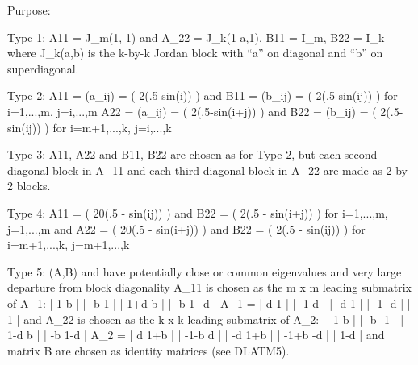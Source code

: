 \begin{DoxyParagraph}{Purpose\+: }
\begin{DoxyVerb}
 Type 1:  A11 = J_m(1,-1) and A_22 = J_k(1-a,1).
          B11 = I_m, B22 = I_k
          where J_k(a,b) is the k-by-k Jordan block with ``a'' on
          diagonal and ``b'' on superdiagonal.

 Type 2:  A11 = (a_ij) = ( 2(.5-sin(i)) ) and
          B11 = (b_ij) = ( 2(.5-sin(ij)) ) for i=1,...,m, j=i,...,m
          A22 = (a_ij) = ( 2(.5-sin(i+j)) ) and
          B22 = (b_ij) = ( 2(.5-sin(ij)) ) for i=m+1,...,k, j=i,...,k

 Type 3:  A11, A22 and B11, B22 are chosen as for Type 2, but each
          second diagonal block in A_11 and each third diagonal block
          in A_22 are made as 2 by 2 blocks.

 Type 4:  A11 = ( 20(.5 - sin(ij)) ) and B22 = ( 2(.5 - sin(i+j)) )
             for i=1,...,m,  j=1,...,m and
          A22 = ( 20(.5 - sin(i+j)) ) and B22 = ( 2(.5 - sin(ij)) )
             for i=m+1,...,k,  j=m+1,...,k

 Type 5:  (A,B) and have potentially close or common eigenvalues and
          very large departure from block diagonality A_11 is chosen
          as the m x m leading submatrix of A_1:
                  |  1  b                            |
                  | -b  1                            |
                  |        1+d  b                    |
                  |         -b 1+d                   |
           A_1 =  |                  d  1            |
                  |                 -1  d            |
                  |                        -d  1     |
                  |                        -1 -d     |
                  |                               1  |
          and A_22 is chosen as the k x k leading submatrix of A_2:
                  | -1  b                            |
                  | -b -1                            |
                  |       1-d  b                     |
                  |       -b  1-d                    |
           A_2 =  |                 d 1+b            |
                  |               -1-b d             |
                  |                       -d  1+b    |
                  |                      -1+b  -d    |
                  |                              1-d |
          and matrix B are chosen as identity matrices (see DLATM5).\end{DoxyVerb}
 
\end{DoxyParagraph}

